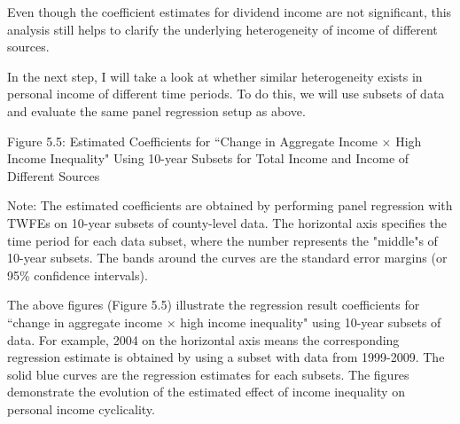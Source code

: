 \documentclass{article}
\begin{document}
Even though the coefficient estimates for dividend income are not significant, this analysis still helps to clarify the underlying heterogeneity of income of different sources. 

\vspace{5mm}

In the next step, I will take a look at whether similar heterogeneity exists in personal income of different time periods. To do this, we will use subsets of data and evaluate the same panel regression setup as above. 





\begin{center}
Figure 5.5: Estimated Coefficients for ``Change in Aggregate Income $\times$ High Income Inequality" Using 10-year Subsets for Total Income and Income of Different Sources\\
\noindent
{}

Note: The estimated coefficients are obtained by performing panel regression with TWFEs on 10-year subsets of county-level data. The horizontal axis specifies the time period for each data subset, where the number represents the "middle"s of 10-year subsets. The bands around the curves are the standard error margins (or 95\% confidence intervals).
\end{center}

The above figures (Figure 5.5) illustrate the regression result coefficients for ``change in aggregate income $\times$ high income inequality" using 10-year subsets of data. For example, 2004 on the horizontal axis means the corresponding regression estimate is obtained by using a subset with data from 1999-2009. The solid blue curves are the regression estimates for each subsets. The figures demonstrate the evolution of the estimated effect of income inequality on personal income cyclicality. 
\end{document}
